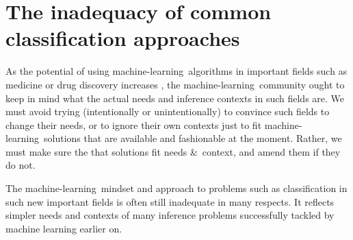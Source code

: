 \documentclass[\ifafour a4paper,12pt,\else a5paper,10pt,\fi%
onecolumn,oneside,article,%
british%
]{memoir}
\theoremstyle{remark}
\theoremstyle{innote}
\newcommand*{\amp}{\&}
\newcommand*{\asudedication}[1]{%
{\par\centering\textit{#1}\par}}
\renewcommand*{\|}[1][]{\nonscript\:#1\vert\nonscript\:\mathopen{}}
\newcommand*{\ml}{machine-learning}
\begin{document}




\section{The inadequacy of common classification approaches}
\label{sec:goal_class}

As the potential of using \ml\ algorithms in important fields such as medicine or drug discovery increases \autocites{lundervoldetal2019,chenetal2018,green2019}, the \ml\ community ought to keep in mind what the actual needs and inference contexts in such fields are. We must avoid trying (intentionally or unintentionally) to convince such fields to change their needs, or to ignore their own contexts just to fit \ml\ solutions that are available and fashionable at the moment. Rather, we must make sure the that solutions fit needs \amp\ context, and amend them if they do not.

The \ml\ mindset and approach to problems such as classification in such new important fields is often still inadequate in many respects. It reflects simpler needs and contexts of many  inference problems successfully tackled by machine learning earlier on.
\end{document}
